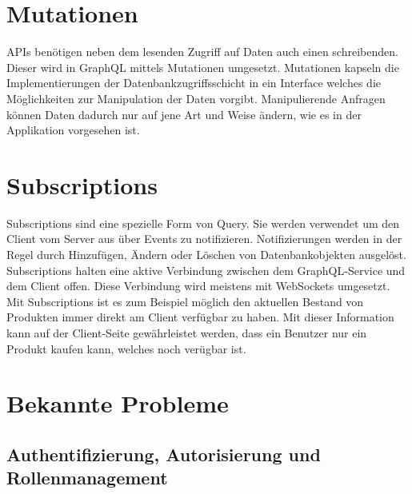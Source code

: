\section{Mutationen}
APIs benötigen neben dem lesenden Zugriff auf Daten auch einen schreibenden.
Dieser wird in GraphQL mittels Mutationen umgesetzt.
Mutationen kapseln die Implementierungen der Datenbankzugriffsschicht in ein Interface welches die Möglichkeiten zur Manipulation der Daten vorgibt.
Manipulierende Anfragen können Daten dadurch nur auf jene Art und Weise ändern, wie es in der Applikation vorgesehen ist.
\cite[S. 54]{kress2020graphql}




\section{Subscriptions}

Subscriptions sind eine spezielle Form von Query.
Sie werden verwendet um den Client vom Server aus über Events zu notifizieren.
Notifizierungen werden in der Regel durch Hinzufügen, Ändern oder Löschen von Datenbankobjekten ausgelöst.
Subscriptions halten eine aktive Verbindung zwischen dem GraphQL-Service und dem Client offen.
Diese Verbindung wird meistens mit WebSockets umgesetzt.
Mit Subscriptions ist es zum Beispiel möglich den aktuellen Bestand von Produkten immer direkt am Client verfügbar zu haben.
Mit dieser Information kann auf der Client-Seite gewährleistet werden, dass ein Benutzer nur ein Produkt kaufen kann, welches noch verügbar ist.
\newline


\section{Bekannte Probleme}

\subsection{Authentifizierung, Autorisierung und Rollenmanagement}

